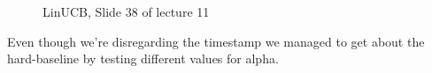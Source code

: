 \documentclass[a4paper, 11pt]{article}
\begin{document}
\begin{figure}[htbp]
\begin{center}
\setlength{\fboxsep}{0pt}%
\setlength{\fboxrule}{1pt}%
%

\caption{LinUCB, Slide 38 of lecture 11}
\label{default}
\end{center}
\end{figure}

Even though we're disregarding the timestamp we managed to get about the hard-baseline by testing different values for alpha.
\end{document}

